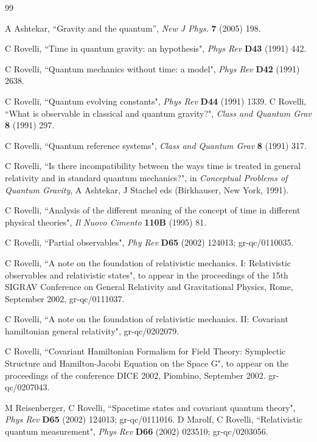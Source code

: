 \documentclass[10pt,nofootinbib]{revtex4}
\begin{document}
\begin{thebibliography}{99}
\small

  A Ashtekar,
 ``Gravity and the quantum'',  {\em New J Phys.}  {\bf 7}  (2005) 198.
  
 C Rovelli, ``Time in quantum gravity: an
hypothesis", {\em Phys Rev} {\bf D43} (1991) 442.

 C Rovelli, ``Quantum mechanics without time:
a model", {\em Phys Rev} {\bf D42} (1991) 2638.

 C Rovelli, ``Quantum evolving constants",
{\em Phys Rev} {\bf D44} (1991) 1339.
 C Rovelli, ``What is observable in
classical and quantum gravity?", {\em Class and Quantum Grav} {\bf {
8}} (1991) 297. 

 C Rovelli, ``Quantum reference systems", 
{\em Class and Quantum Grav} {\bf 8} (1991) 317.

 C Rovelli, ``Is there incompatibility
between the ways time is treated in general relativity and in standard
quantum mechanics?", in {\em Conceptual Problems of Quantum Gravity},
A Ashtekar, J Stachel eds (Birkhauser, New York, 1991).

 C Rovelli, ``Analysis of the different
meaning of the concept of time in different physical theories", {\em
Il Nuovo Cimento} {\bf 110B} (1995) 81.

 C Rovelli, ``Partial observables", {\em Phy
Rev} {\bf D65} (2002) 124013; gr-qc/0110035.

 C Rovelli, ``A note on the foundation of
relativistic mechanics.  I: Relativistic observables and relativistic
states", to appear in the proceedings of the 15th SIGRAV Conference on
General Relativity and Gravitational Physics, Rome, September 2002,
gr-qc/0111037.

 C Rovelli, ``A note on the foundation of relativistic
mechanics.  II: Covariant hamiltonian general relativity",
gr-qc/0202079.

 C Rovelli, ``Covariant Hamiltonian Formalism
for Field Theory: Symplectic Structure and Hamilton-Jacobi Equation on
the Space G", to appear on the proceedings of the conference DICE
2002, Piombino, September 2002.  gr-qc/0207043.

 M Reisenberger, C Rovelli, ``Spacetime
states and covariant quantum theory", {\em Phys Rev} {\bf D65}
(2002) 124013; gr-qc/0111016.  D Marolf, C Rovelli, ``Relativistic
quantum measurement", {\em Phys Rev} {\bf D66} (2002) 023510; gr-qc/0203056.


\end{thebibliography}
\end{document}
